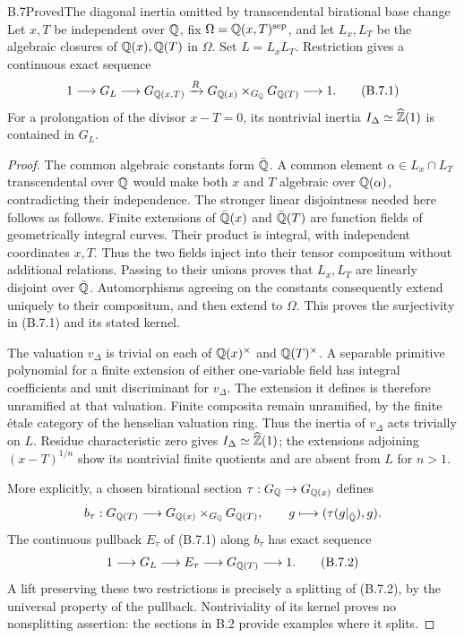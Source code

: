 \begin{statement}{B.7}{Proved}{The diagonal inertia omitted by transcendental birational base change}
Let $x,T$ be independent over $\mathbb Q$, fix
$\Omega=\mathbb Q(x,T)^{\mathrm{sep}}$, and let $L_x,L_T$ be the algebraic
closures of $\mathbb Q(x),\mathbb Q(T)$ in $\Omega$.  Set $L=L_xL_T$.
Restriction gives a continuous exact sequence
\[
 1\longrightarrow G_L\longrightarrow G_{\mathbb Q(x,T)}
 \xrightarrow{R}G_{\mathbb Q(x)}\times_{G_\mathbb Q}G_{\mathbb Q(T)}
 \longrightarrow1.                              \tag{B.7.1}
\]
For a prolongation of the divisor $x-T=0$, its nontrivial inertia
$I_\Delta\simeq\widehat{\mathbb Z}(1)$ is contained in $G_L$.
\end{statement}
\begin{proof}
The common algebraic constants form $\bar{\mathbb Q}$.  A common element
$\alpha\in L_x\cap L_T$ transcendental over $\mathbb Q$ would make both
$x$ and $T$ algebraic over $\mathbb Q(\alpha)$, contradicting their
independence.  The stronger linear disjointness needed here follows
as follows.  Finite extensions of $\bar{\mathbb Q}(x)$ and $\bar{\mathbb Q}(T)$
are function fields of geometrically integral curves.  Their product
is integral, with independent coordinates $x,T$.  Thus the two
fields inject into their tensor compositum without additional
relations.  Passing to their unions proves that $L_x,L_T$ are
linearly disjoint over $\bar{\mathbb Q}$.  Automorphisms agreeing on the
constants consequently extend uniquely to their compositum, and
then extend to $\Omega$.  This proves the surjectivity in (B.7.1)
and its stated kernel.

The valuation $v_\Delta$ is trivial on each of $\mathbb Q(x)^\times$
and $\mathbb Q(T)^\times$.  A separable primitive polynomial for a finite
extension of either one-variable field has integral coefficients
and unit discriminant for $v_\Delta$.  The extension it defines
is therefore unramified at that valuation.  Finite composita remain
unramified, by the finite \'etale category of the henselian valuation
ring.  Thus the inertia of $v_\Delta$ acts trivially on $L$.
Residue characteristic zero gives $I_\Delta\simeq\widehat{\mathbb Z}(1)$;
the extensions adjoining $(x-T)^{1/n}$ show its nontrivial finite
quotients and are absent from $L$ for $n>1$.

More explicitly, a chosen birational section
$\tau:G_\mathbb Q\to G_{\mathbb Q(x)}$ defines
\[
 b_\tau:G_{\mathbb Q(T)}\longrightarrow
          G_{\mathbb Q(x)}\times_{G_\mathbb Q}G_{\mathbb Q(T)},\qquad
 g\longmapsto(\tau(g|_{\bar{\mathbb Q}}),g).
\]
The continuous pullback $E_\tau$ of (B.7.1) along $b_\tau$ has
exact sequence
\[
 1\longrightarrow G_L\longrightarrow E_\tau
       \longrightarrow G_{\mathbb Q(T)}\longrightarrow1. \tag{B.7.2}
\]
A lift preserving these two restrictions is precisely a splitting
of (B.7.2), by the universal property of the pullback.  Nontriviality
of its kernel proves no nonsplitting assertion: the sections in B.2
provide examples where it splits.


\end{proof}
